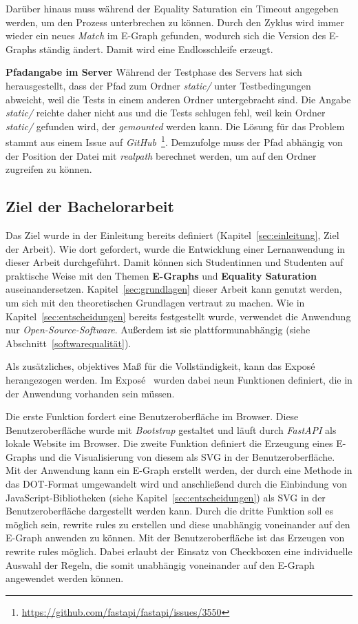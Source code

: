 Darüber hinaus muss während der Equality Saturation ein Timeout angegeben werden, um den Prozess unterbrechen zu können. Durch den Zyklus wird immer wieder ein neues \textit{Match}
im E-Graph gefunden, wodurch sich die Version des E-Graphs ständig ändert. Damit wird eine Endlosschleife erzeugt.

\noindent\textbf{Pfadangabe im Server} Während der Testphase des Servers hat sich herausgestellt, dass der Pfad zum Ordner \textit{static/} unter Testbedingungen abweicht, weil
die Tests in einem anderen Ordner untergebracht sind. Die Angabe \textit{static/} reichte daher nicht aus und die Tests schlugen fehl, weil kein Ordner \textit{static/} gefunden wird, der \textit{gemounted} werden kann. Die Lösung für das Problem stammt aus einem Issue auf 
\textit{GitHub}~\footnote{\hspace{1.5mm}\url{https://github.com/fastapi/fastapi/issues/3550}}. Demzufolge muss der Pfad abhängig von der Position der Datei mit \textit{realpath} berechnet werden, um
auf den Ordner zugreifen zu können.

\subsection{Ziel der Bachelorarbeit}\label{sub:ziel}

Das Ziel wurde in der Einleitung bereits definiert (Kapitel~\ref{sec:einleitung}, Ziel der Arbeit).
Wie dort gefordert, wurde die Entwicklung einer Lernanwendung in dieser Arbeit durchgeführt. Damit können sich Studentinnen und Studenten auf praktische Weise mit den Themen 
\textbf{E-Graphs} und \textbf{Equality Saturation} auseinandersetzen. Kapitel~\ref{sec:grundlagen} dieser Arbeit kann genutzt werden, um sich mit den
theoretischen Grundlagen vertraut zu machen. 
Wie in Kapitel~\ref{sec:entscheidungen} bereits festgestellt wurde, verwendet die Anwendung nur \textit{Open-Source-Software}. Außerdem ist
sie plattformunabhängig (siehe Abschnitt~\ref{softwarequalität}).

Als zusätzliches, objektives Maß für die Vollständigkeit, kann das Exposé herangezogen werden.
Im Exposé~\cite{expose} wurden dabei neun Funktionen definiert, die in der Anwendung vorhanden sein müssen.

Die erste Funktion fordert eine Benutzeroberfläche im Browser. Diese Benutzeroberfläche wurde mit \textit{Bootstrap} gestaltet und läuft durch \textit{FastAPI} als lokale Website 
im Browser. Die zweite Funktion definiert die Erzeugung eines E-Graphs und die Visualisierung von diesem als SVG in der Benutzeroberfläche. Mit der Anwendung kann ein E-Graph erstellt
werden, der durch eine Methode in das DOT-Format umgewandelt wird und anschließend durch die Einbindung von JavaScript-Bibliotheken (siehe Kapitel~\ref{sec:entscheidungen}) als SVG in der Benutzeroberfläche dargestellt werden kann.
Durch die dritte Funktion soll es möglich sein, rewrite rules zu erstellen und diese unabhängig voneinander auf den E-Graph anwenden zu können.  
Mit der Benutzeroberfläche ist das Erzeugen von rewrite rules möglich. Dabei erlaubt der Einsatz von Checkboxen eine individuelle Auswahl der Regeln, die somit unabhängig
voneinander auf den E-Graph angewendet werden können.

